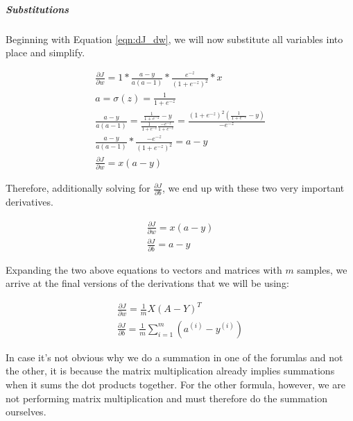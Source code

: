 \documentclass{article}
\newcommand{\mysubparagraph}[1]{\subparagraph{#1}\mbox{}}
\begin{document}
\mysubparagraph{Substitutions}

Beginning with Equation \ref{eqn:dJ_dw}, we will now substitute all variables into place and simplify.

\begin{gather}
\frac{\partial{J}}{\partial{w}} = 1 * \frac{a-y}{a(a-1)} * \frac{e^{-z}}{(1+e^{-z})^{2}} * x \\
%
a = \sigma(z) = \frac{1}{1 + e^{-z}} \\
%
\frac{a-y}{a(a-1)} = \frac{\frac{1}{1 + e^{-z}} - y}{\frac{1}{1 + e^{-z}} \frac{-e^{-z}}{1 + e^{-z}}} = \frac{(1+e^{-z})^2 (\frac{1}{1 + e^{-z}} - y)}{-e^{-z}} \\
%
\frac{a-y}{a(a-1)} * \frac{-e^{-z}}{(1+e^{-z})^{2}} = a-y \\
%
\frac{\partial{J}}{\partial{w}} = x(a-y)
\end{gather}

Therefore, additionally solving for $\frac{\partial{J}}{\partial{b}}$, we end up with these two very important derivatives.

\begin{gather}
\frac{\partial{J}}{\partial{w}} = x(a-y) \\
%
\frac{\partial{J}}{\partial{b}} = a-y
\end{gather}

Expanding the two above equations to vectors and matrices with $m$ samples, we arrive at the final versions of the derivations that we will be using:

\begin{gather}
\frac{\partial{J}}{\partial{w}} = \frac{1}{m} X(A-Y)^{T} \\
%
\frac{\partial{J}}{\partial{b}} = \frac{1}{m} \sum_{i=1}^{m} (a^{(i)} - y^{(i)})
\end{gather}

In case it's not obvious why we do a summation in one of the forumlas and not the other, it is because the matrix multiplication already implies summations when it sums the dot products together.  For the other formula, however, we are not performing matrix multiplication and must therefore do the summation ourselves.
\end{document}
